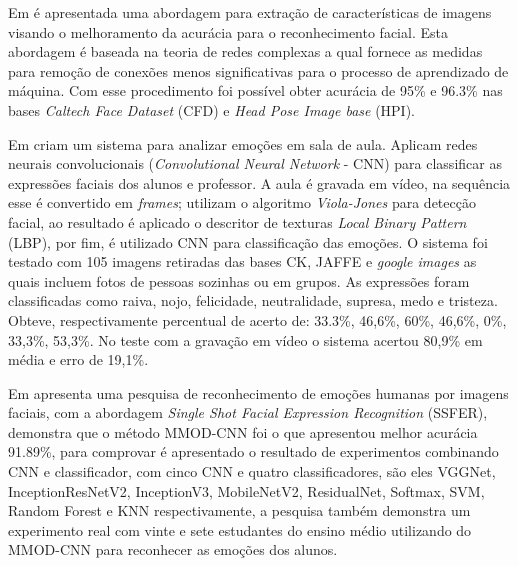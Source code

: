 Em \cite{piotto:2016} é apresentada uma abordagem para extração de características de imagens visando o melhoramento da acurácia para o reconhecimento facial. Esta abordagem é baseada na teoria de redes complexas a qual fornece as medidas para remoção de conexões menos significativas para o processo de aprendizado de máquina. Com esse procedimento foi possível obter acurácia de 95\% e 96.3\% nas bases \textit{Caltech Face Dataset} (CFD)  e \textit{Head Pose Image base} (HPI).

Em \cite{sahla:2016} criam um sistema para analizar emoções em sala de aula. Aplicam redes neurais convolucionais (\textit{Convolutional Neural Network} - CNN) para classificar as expressões faciais dos alunos e professor. A aula é gravada em vídeo, na sequência esse é convertido em \textit{frames}; utilizam o algoritmo \textit{Viola-Jones} para detecção facial, ao resultado é aplicado o descritor de texturas \textit{Local Binary Pattern} (LBP), por fim, é utilizado CNN para classificação das emoções. O sistema foi testado com 105 imagens retiradas das bases CK, JAFFE e \textit{google images} as quais incluem fotos de pessoas sozinhas ou em grupos. As expressões foram classificadas como raiva, nojo, felicidade, neutralidade, supresa, medo e tristeza. Obteve, respectivamente percentual de acerto de: 33.3\%, 46,6\%, 60\%, 46,6\%, 0\%, 33,3\%, 53,3\%. No teste com a gravação em vídeo o sistema acertou 80,9\% em média e erro de 19,1\%. 

Em \cite{cruz:2019} apresenta uma pesquisa de reconhecimento de emoções humanas por imagens faciais, com a abordagem \textit{Single Shot Facial Expression Recognition} (SSFER), demonstra que o método MMOD-CNN foi o que apresentou melhor acurácia 91.89\%, para comprovar é apresentado o resultado de experimentos combinando CNN e classificador, com cinco CNN e quatro classificadores, são eles VGGNet, InceptionResNetV2, InceptionV3, MobileNetV2, ResidualNet, Softmax, SVM, Random Forest e KNN respectivamente, a pesquisa também demonstra um experimento real com vinte e sete estudantes do ensino médio utilizando do MMOD-CNN para reconhecer as emoções dos alunos.